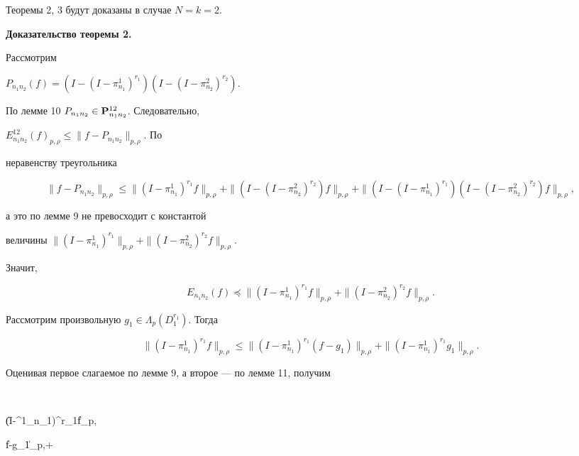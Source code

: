  


Теоремы 2, 3 будут доказаны в случае $N=k=2$. 





{\bf Доказательство теоремы 2.}  


Рассмотрим 


$P_{n_1n_2}(f)=(I-(I-\pi^1_{n_1})^{r_1})(I-(I-\pi^2_{n_2})^{r_2})$. 


По лемме 10\; $P_{n_1n_2}\in\bold P^{12}_{n_1n_2}$. Следовательно, 


$E^{12}_{n_1n_2}(f)_{p,\rho}\le\|f-P_{n_1n_2}\|_{p,\rho}$. По 


неравенству треугольника 


$$ 


\|f-P_{n_1n_2}\|_{p,\rho}\le\|(I-\pi^1_{n_1})^{r_1}f\|_{p,\rho}+ 


\|(I-(I-\pi^2_{n_2})^{r_2})f\|_{p,\rho}+ 


\|(I-(I-\pi^1_{n_1})^{r_1})(I-(I-\pi^2_{n_2})^{r_2} 


)f\|_{p,\rho}, 


$$ 


а это по лемме 9 не превосходит с константой 


величины $\|(I-\pi^1_{n_1})^{r_1}\|_{p,\rho}+ 


\|(I-\pi^2_{n_2})^{r_2}f\|_{p,\rho}$. 


Значит,


\begin{equation} 


E_{n_1n_2}(f)\preceq\|(I-\pi^1_{n_1})^{r_1}f\|_{p,\rho}+ 


\|(I-\pi^2_{n_2})^{r_2}f\|_{p,\rho}. 


\end{equation} 


Рассмотрим произвольную $g_1\in\Lambda_p(D^{r_1}_1)$. Тогда 


$$ 


\|(I-\pi^1_{n_1})^{r_1}f\|_{p,\rho}\le 


\|(I-\pi^1_{n_1})^{r_1}(f-g_1)\|_{p,\rho}+ 


\|(I-\pi^1_{n_1})^{r_1}g_1\|_{p,\rho}. 


$$ 


Оценивая первое слагаемое по лемме 9, а второе --- по лемме 11, получим 


$$ 


\|(I-\pi^1_{n_1})^{r_1}f\|_{p,\rho}\preceq 


\|f-g_1\|_{p,\rho}+ 



